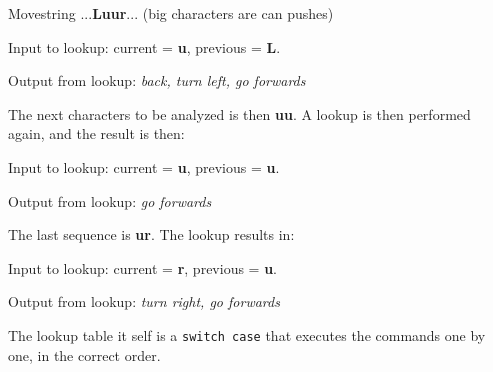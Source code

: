 \noindent
Movestring ...\textbf{Luur}... (big characters are can pushes)

\noindent
Input to lookup: current = \textbf{u}, previous = \textbf{L}.

\noindent
Output from lookup: \textit{back, turn left, go forwards}

The next characters to be analyzed is then \textbf{uu}.
A lookup is then performed again, and the result is then:

\noindent
Input to lookup: current = \textbf{u}, previous = \textbf{u}.

\noindent
Output from lookup: \textit{go forwards}

The last sequence is \textbf{ur}. The lookup results in:

\noindent
Input to lookup: current = \textbf{r}, previous = \textbf{u}.

\noindent
Output from lookup: \textit{turn right, go forwards}

The lookup table it self is a \lstinline|switch case| that executes the commands one by one, in the correct order.